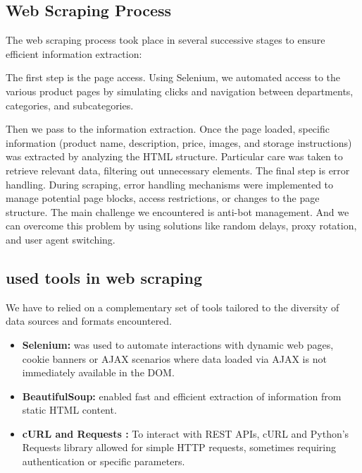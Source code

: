 \subsection{Web Scraping Process}
\par The web scraping process took place in several successive stages to ensure
efficient information extraction:
\par The first step is the page access. Using Selenium, we automated access
to the various product pages by simulating clicks and navigation between
departments, categories, and subcategories.
\par Then we pass to the information extraction. Once the page loaded, specific information (product name, description, price, images, and storage
instructions) was extracted by analyzing the HTML structure. Particular care was taken to retrieve relevant data, filtering out unnecessary
elements.
The final step is error handling. During scraping, error handling mechanisms were implemented to manage potential page blocks, access restrictions, or changes to the page structure. The main challenge we
encountered is anti-bot management. And we can overcome this problem
by using solutions like random delays, proxy rotation, and user agent
switching.





\subsection{used tools in web scraping}
We have to relied on a complementary set of tools tailored to the diversity
of data sources and formats encountered.

\begin{itemize}[label=\textbf{-}]
    \item \textbf{Selenium:} was used to automate interactions with dynamic web pages, cookie banners or  AJAX scenarios where data loaded via AJAX is not immediately available in the DOM.
    \item \textbf{BeautifulSoup:}  enabled fast and efficient extraction of information from static HTML content.
    \item \textbf{cURL and Requests :} To interact with REST APIs, cURL and Python’s Requests library allowed for simple HTTP requests, sometimes requiring authentication or specific parameters. 
\end{itemize}



